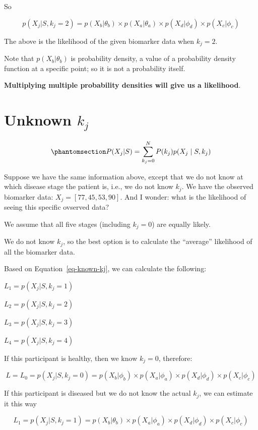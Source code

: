 \documentclass[
  letterpaper,
  DIV=11,
  numbers=noendperiod]{scrreprt}
\begin{document}
So

\[p(X_j | S, k_j = 2) = p (X_b | \theta_b) \times p (X_a | \theta_a) \times p (X_d | \phi_d) \times p (X_c | \phi_c)\]

The above is the likelihood of the given biomarker data when
\(k_j = 2\).

Note that \(p (X_b | \theta_b)\) is probability density, a value of a
probability density function at a specific point; so it is not a
probability itself.

\textbf{Multiplying multiple probability densities will give us a
likelihood}.

\section{\texorpdfstring{Unknown
\(k_j\)}{Unknown k\_j}}\label{unknown-k_j}

\begin{equation}\phantomsection\label{eq-unknown-kj}{
P(X_{j} | S) = \sum_{k_j=0}^N{P(k_j) p(X_{j} \mid S, k_j)}
}\end{equation}

Suppose we have the same information above, except that we do not know
at which disease stage the patient is, i.e., we do not know \(k_j\). We
have the observed biomarker data: \(X_j = [77, 45, 53, 90]\). And I
wonder: what is the likelihood of seeing this specific ovserved data?

We assume that all five stages (including \(k_j = 0\)) are equally
likely.

We do not know \(k_j\), so the best option is to calculate the
``average'' likelihood of all the biomarker data.

Based on Equation~\ref{eq-known-kj}, we can calculate the following:

\(L_1 = p(X_j | S, k_j = 1)\)

\(L_2 = p(X_j | S, k_j = 2)\)

\(L_3 = p(X_j | S, k_j = 3)\)

\(L_4 = p(X_j | S, k_j = 4)\)

If this participant is healthy, then we know \(k_j = 0\), therefore:

\[L = L_0 = p(X_j | S, k_j = 0) = p (X_b | \phi_b) \times p (X_a | \phi_a) \times p (X_d | \phi_d) \times p (X_c | \phi_c)\]

If this participant is diseased but we do not know the actual \(k_j\),
we can estimate it this way

\[L_1 = p(X_j | S, k_j = 1) = p (X_b | \theta_b) \times p (X_a | \phi_a) \times p (X_d | \phi_d) \times p (X_c | \phi_c)\]
\end{document}

